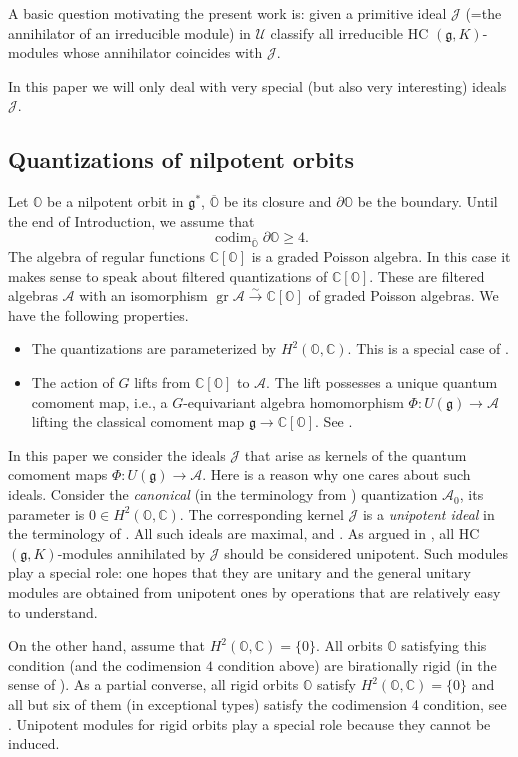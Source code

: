 \documentclass[12pt]{amsart}
\newcommand{\C}{\mathbb{C}}
\newcommand{\A}{\mathcal{A}}
\newcommand{\U}{\mathcal{U}}
\newcommand{\J}{\mathcal{J}}
\newcommand{\g}{\mathfrak{g}}
\newcommand{\Orb}{\mathbb{O}}
\newcommand{\gr}{\operatorname{gr}}
\theoremstyle{definition}
\numberwithin{equation}{section}
\begin{document}
A basic question motivating the present work is: given a primitive ideal $\J$ (=the annihilator of
an irreducible module) in $\U$ classify all irreducible HC $(\g,K)$-modules whose annihilator
coincides with $\J$.

In this paper we will only deal with very special (but also very interesting) ideals $\J$.


\subsection{Quantizations of nilpotent orbits}
Let $\Orb$ be a nilpotent orbit in $\g^*$, $\overline{\Orb}$ be its closure and $\partial\Orb$
be the boundary. Until the end of Introduction, we assume that
$$\operatorname{codim}_{\overline{\Orb}}\partial\Orb\geqslant 4.$$
The algebra of regular functions $\C[\Orb]$ is a graded Poisson algebra. In this case
it makes sense to speak about filtered quantizations of $\C[\Orb]$. These are filtered
algebras $\A$ with an isomorphism $\gr\A\xrightarrow{\sim} \C[\Orb]$ of graded Poisson algebras. We have the following properties.
\begin{itemize}
\item The quantizations are parameterized by $H^2(\Orb,\C)$. This is a special case
of \cite[Theorem 3.4]{orbit}.
\item The action of $G$ lifts from $\C[\Orb]$ to $\A$. The lift possesses a unique quantum comoment map, i.e., a $G$-equivariant algebra homomorphism
$\Phi:U(\g)\rightarrow \A$ lifting the classical comoment map $\g\rightarrow \C[\Orb]$.
See \cite[Section 5.3]{orbit}.
\end{itemize}

In this paper we consider the ideals $\J$ that arise as kernels of the quantum comoment maps
$\Phi:U(\g)\rightarrow \A$.
Here is a reason why one cares about such ideals. Consider the {\it canonical} (in the terminology
from \cite{LMM}) quantization $\A_0$, its parameter is $0\in H^2(\Orb,\C)$. The corresponding
kernel $\J$ is a {\it unipotent ideal} in the terminology of \cite{LMM}. All such ideals are maximal,
\cite[Theorem 8.5.1]{LMM} and \cite[Theorem 1.0.2]{MM}. As argued in \cite[Section 6.3.4]{LMM}, all HC $(\g,K)$-modules annihilated by $\J$
should be considered unipotent. Such modules play a special role: one hopes that they are unitary and the general unitary 
modules are obtained from unipotent ones by operations that are relatively easy to understand. 

On the other hand, assume that $H^2(\Orb,\C)=\{0\}$. All orbits $\Orb$ satisfying this condition
(and the codimension $4$ condition above) are birationally rigid (in the sense of
\cite[Definition 1.2]{orbit}).
As a partial converse, all rigid orbits $\Orb$
satisfy $H^2(\Orb,\C)=\{0\}$ and all but six of them (in exceptional types) satisfy
the codimension 4 condition, see \cite[Lemma 2.4]{reg}. Unipotent modules
for rigid orbits play a special role because they cannot be induced.
\end{document}
